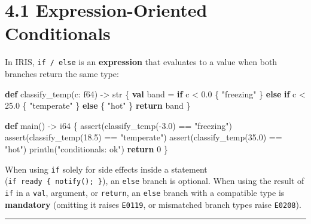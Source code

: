 \documentclass[
  english,
  oneside]{book}
\newenvironment{Shaded}{\begin{snugshade}}{\end{snugshade}}
\newcommand{\ControlFlowTok}[1]{\textcolor[rgb]{0.77,0.53,0.75}{\textbf{#1}}}
\newcommand{\DataTypeTok}[1]{\textcolor[rgb]{0.31,0.79,0.69}{#1}}
\newcommand{\DecValTok}[1]{\textcolor[rgb]{0.71,0.81,0.66}{#1}}
\newcommand{\FloatTok}[1]{\textcolor[rgb]{0.71,0.81,0.66}{#1}}
\newcommand{\FunctionTok}[1]{\textcolor[rgb]{0.86,0.86,0.67}{#1}}
\newcommand{\KeywordTok}[1]{\textcolor[rgb]{0.34,0.61,0.84}{\textbf{#1}}}
\newcommand{\NormalTok}[1]{\textcolor[rgb]{0.83,0.83,0.83}{#1}}
\newcommand{\OperatorTok}[1]{\textcolor[rgb]{0.83,0.83,0.83}{#1}}
\newcommand{\StringTok}[1]{\textcolor[rgb]{0.81,0.57,0.47}{#1}}
\begin{document}
\section{4.1 Expression-Oriented
Conditionals}\label{expression-oriented-conditionals}

In IRIS, \texttt{if\ /\ else} is an \textbf{expression} that evaluates
to a value when both branches return the same type:

\begin{Shaded}
\begin{Highlighting}[]
\KeywordTok{def}\NormalTok{ classify\_temp(c: }\DataTypeTok{f64}\NormalTok{) }\OperatorTok{{-}\textgreater{}} \DataTypeTok{str}\NormalTok{ \{}
    \KeywordTok{val} \FunctionTok{band} \OperatorTok{=} \ControlFlowTok{if}\NormalTok{ c }\OperatorTok{\textless{}} \FloatTok{0.0}\NormalTok{ \{}
        \StringTok{"freezing"}
\NormalTok{    \} }\ControlFlowTok{else} \ControlFlowTok{if}\NormalTok{ c }\OperatorTok{\textless{}} \FloatTok{25.0}\NormalTok{ \{}
        \StringTok{"temperate"}
\NormalTok{    \} }\ControlFlowTok{else}\NormalTok{ \{}
        \StringTok{"hot"}
\NormalTok{    \}}
    \ControlFlowTok{return} \FunctionTok{band}
\NormalTok{\}}

\KeywordTok{def}\NormalTok{ main() }\OperatorTok{{-}\textgreater{}} \DataTypeTok{i64}\NormalTok{ \{}
    \FunctionTok{assert}\NormalTok{(classify\_temp(}\OperatorTok{{-}}\FloatTok{3.0}\NormalTok{) }\OperatorTok{==} \StringTok{"freezing"}\NormalTok{)}
    \FunctionTok{assert}\NormalTok{(classify\_temp(}\FloatTok{18.5}\NormalTok{) }\OperatorTok{==} \StringTok{"temperate"}\NormalTok{)}
    \FunctionTok{assert}\NormalTok{(classify\_temp(}\FloatTok{35.0}\NormalTok{) }\OperatorTok{==} \StringTok{"hot"}\NormalTok{)}
\NormalTok{    println(}\StringTok{"conditionals: ok"}\NormalTok{)}
    \ControlFlowTok{return} \DecValTok{0}
\NormalTok{\}}
\end{Highlighting}
\end{Shaded}

When using \texttt{if} solely for side effects inside a statement
(\texttt{if\ ready\ \{\ notify();\ \}}), an \texttt{else} branch is
optional. When using the result of \texttt{if} in a \texttt{val},
argument, or \texttt{return}, an \texttt{else} branch with a compatible
type is \textbf{mandatory} (omitting it raises \texttt{E0119}, or
mismatched branch types raise \texttt{E0208}).

\begin{center}\rule{0.5\linewidth}{0.5pt}\end{center}
\end{document}
